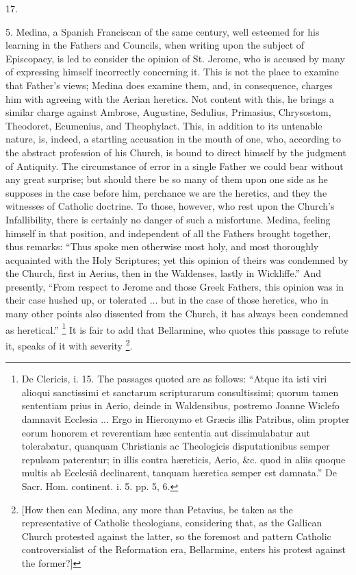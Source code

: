17.

5. Medina, a Spanish Franciscan of the same century, well esteemed
for his learning in the Fathers and Councils, when writing upon the
subject of Episcopacy, is led to consider the opinion of St. Jerome,
who is accused by many of expressing himself incorrectly concerning
it. This is not the place to examine that Father's views; Medina does
examine them, and, in consequence, charges him with agreeing with the
Aerian heretics. Not content with this, he brings a similar charge
against Ambrose, Augustine, Sedulius, Primasius, Chrysostom, Theodoret,
Ecumenius, and Theophylact. This, in addition to its untenable nature,
is, indeed, a startling accusation in the mouth of one, who, according
to the abstract profession of his Church, is bound to direct himself
by the judgment of Antiquity. The circumstance of error in a single
Father we could bear without any great surprise; but should there be
so many of them upon one side as he supposes in the case before him,
perchance we are the heretics, and they the witnesses of Catholic
doctrine. To those, however, who rest upon the Church's Infallibility,
there is certainly no danger of such a misfortune. Medina, feeling
himself in that position, and independent of all the Fathers
brought together, thus remarks: ``Thus spoke men otherwise most
holy, and most thoroughly acquainted with the Holy Scriptures; yet
this opinion of theirs was condemned by the Church, first in Aerius,
then in the Waldenses, lastly in Wickliffe.'' And presently,
``From respect to Jerome and those Greek Fathers, this opinion was
in their case hushed up, or tolerated ... but in the case of those
heretics, who in many other points also dissented from the Church, it
has always been condemned as heretical.'' \footnote{De Clericis, i. 15. The passages quoted
are as follows: ``Atque ita isti viri alioqui sanctissimi et
sanctarum scripturarum consultissimi; quorum tamen sententiam prius in
Aerio, deinde in Waldensibus, postremo Joanne Wiclefo damnavit
Ecclesia ... Ergo in Hieronymo et Græcis illis Patribus, olim propter
eorum honorem et reverentiam hæc sententia aut dissimulabatur aut
tolerabatur, quanquam Christianis ac Theologicis disputationibus
semper repulsam paterentur; in illis contra hæreticis, Aerio, \&c.
quod in aliis quoque multis ab Ecclesiâ declinarent, tanquam
hæretica semper est damnata.'' De Sacr. Hom. continent. i. 5. pp.
5, 6.} It is fair to add that Bellarmine, who quotes this passage to
refute it, speaks of it with severity \footnote{[How then can Medina, any more than
Petavius, be taken as the representative of Catholic theologians,
considering that, as the Gallican Church protested against the latter,
so the foremost and pattern Catholic controversialist of the
Reformation era, Bellarmine, enters his protest against the former?]}.

